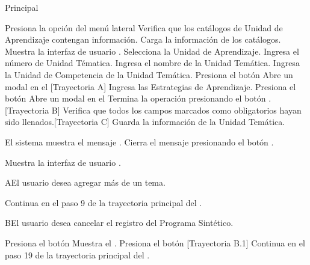 \begin{UCtrayectoria}{Principal}

\UCpaso[\UCactor] Presiona la opción  del menú lateral
\UCpaso Verifica que los catálogos de Unidad de Aprendizaje contengan información.
\UCpaso Carga la información de los catálogos.
\UCpaso Muestra la interfaz de usuario .
\UCpaso[\UCactor] Selecciona la Unidad de Aprendizaje.
\UCpaso[\UCactor] Ingresa el número de Unidad Tématica.
\UCpaso[\UCactor] Ingresa el nombre de la Unidad Temática.
\UCpaso[\UCactor] Ingresa la Unidad de Competencia de la Unidad Temática.
\UCpaso[\UCactor] Presiona el botón 
\UCpaso Abre un modal en el  [Trayectoria A]
\UCpaso[\UCactor] Ingresa las Estrategias de Aprendizaje.
\UCpaso[\UCactor] Presiona el botón 
\UCpaso Abre un modal en el 
\UCpaso[\UCactor] Termina la operación presionando el botón . [Trayectoria B]
\UCpaso Verifica que todos los campos marcados como obligatorios hayan sido llenados.[Trayectoria C]
\UCpaso Guarda la información de la Unidad Temática.

\UCpaso El sistema muestra el mensaje .
\UCpaso[\UCactor] Cierra el mensaje presionando el botón . 



\UCpaso Muestra la interfaz de usuario .
\end{UCtrayectoria}


\begin{UCtrayectoriaA}{A}{El usuario desea agregar más de un tema.}

\UCpaso Continua en el paso 9 de la trayectoria principal del .

\end{UCtrayectoriaA}

\begin{UCtrayectoriaA}{B}{El usuario desea cancelar el registro del Programa Sintético.}

\UCpaso[\UCactor] Presiona el botón 
\UCpaso Muestra el .
\UCpaso[\UCactor] Presiona el botón  [Trayectoria B.1]
\UCpaso Continua en el paso 19 de la trayectoria principal del .

\end{UCtrayectoriaA}

